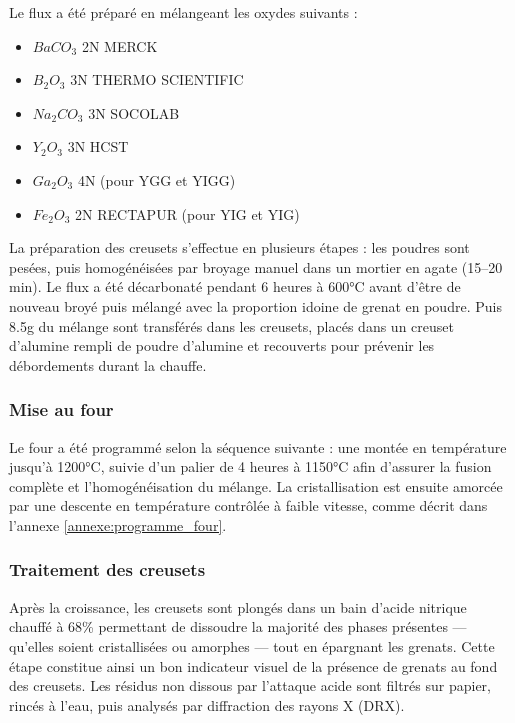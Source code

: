 \documentclass{rapportENSCP}
\begin{document}
Le flux a été préparé en mélangeant les oxydes suivants :

\begin{itemize}
    \item $BaCO_3$ 2N MERCK
    \item $B_2O_3$ 3N THERMO SCIENTIFIC
    \item $Na_2CO_3$ 3N SOCOLAB
    \item $Y_2O_3$ 3N HCST
    \item $Ga_2O_3$ 4N (pour YGG et YIGG)
    \item $Fe_2O_3$ 2N RECTAPUR (pour YIG et YIG)
\end{itemize}

La préparation des creusets s’effectue en plusieurs étapes : les poudres sont pesées, puis homogénéisées par broyage manuel dans un mortier en agate (15–20 min). Le flux a été décarbonaté pendant 6 heures à 600°C avant d'être de nouveau broyé puis mélangé avec la proportion idoine de grenat en poudre. Puis 8.5g du mélange sont transférés dans les creusets, placés dans un creuset d’alumine rempli de poudre d’alumine et recouverts pour prévenir les débordements durant la chauffe.

\subsubsection{Mise au four}

Le four a été programmé selon la séquence suivante : une montée en température jusqu’à 1200°C, suivie d’un palier de 4 heures à 1150°C afin d’assurer la fusion complète et l’homogénéisation du mélange. La cristallisation est ensuite amorcée par une descente en température contrôlée à faible vitesse, comme décrit dans l’annexe \ref{annexe:programme_four}.

\subsubsection{Traitement des creusets}

Après la croissance, les creusets sont plongés dans un bain d'acide nitrique chauffé à 68\% permettant de dissoudre la majorité des phases présentes — qu’elles soient cristallisées ou amorphes — tout en épargnant les grenats. Cette étape constitue ainsi un bon indicateur visuel de la présence de grenats au fond des creusets. Les résidus non dissous par l’attaque acide sont filtrés sur papier, rincés à l’eau, puis analysés par diffraction des rayons X (DRX).
\end{document}
